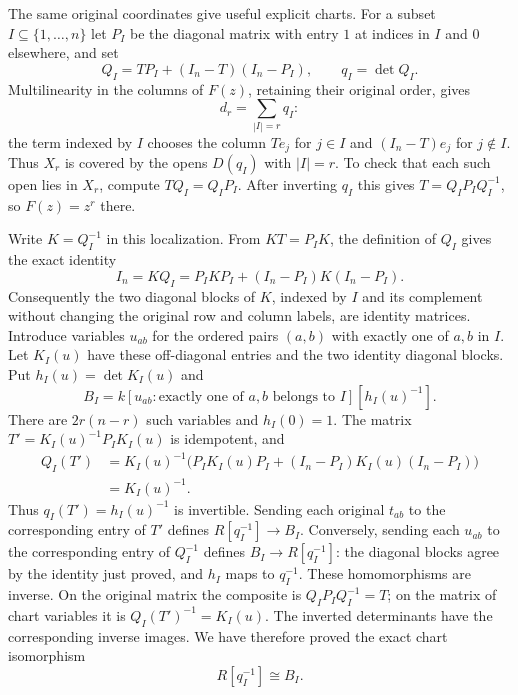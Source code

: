 \begin{example}
The same original coordinates give useful explicit charts.
For a subset $I\subseteq\{1,\ldots,n\}$ let $P_I$ be the diagonal
matrix with entry $1$ at indices in $I$ and $0$ elsewhere, and set
$$
Q_I=TP_I+(I_n-T)(I_n-P_I),\qquad q_I=\det Q_I.
$$
Multilinearity in the columns of $F(z)$, retaining their original
order, gives
$$
d_r=\sum_{|I|=r}q_I:
$$
the term indexed by $I$ chooses the column $Te_j$ for $j\in I$
and $(I_n-T)e_j$ for $j\notin I$.
Thus $X_r$ is covered by the opens $D(q_I)$ with $|I|=r$.
To check that each such open lies in $X_r$, compute
$TQ_I=Q_IP_I$. After inverting $q_I$ this gives
$T=Q_IP_IQ_I^{-1}$, so $F(z)=z^r$ there.

Write $K=Q_I^{-1}$ in this localization. From $KT=P_IK$,
the definition of $Q_I$ gives the exact identity
$$
I_n=KQ_I=P_IKP_I+(I_n-P_I)K(I_n-P_I).
$$
Consequently the two diagonal blocks of $K$, indexed by $I$ and
its complement without changing the original row and column labels,
are identity matrices. Introduce variables $u_{ab}$ for the ordered
pairs $(a,b)$ with exactly one of $a,b$ in $I$. Let $K_I(u)$ have
these off-diagonal entries and the two identity diagonal blocks.
Put $h_I(u)=\det K_I(u)$ and
$$
B_I=k[u_{ab}: \text{exactly one of }a,b\text{ belongs to }I]
[h_I(u)^{-1}].
$$
There are $2r(n-r)$ such variables and $h_I(0)=1$.
The matrix $T'=K_I(u)^{-1}P_IK_I(u)$ is idempotent, and
$$
\begin{aligned}
Q_I(T')
&=K_I(u)^{-1}\bigl(P_IK_I(u)P_I
 +(I_n-P_I)K_I(u)(I_n-P_I)\bigr)\\
&=K_I(u)^{-1}.
\end{aligned}
$$
Thus $q_I(T')=h_I(u)^{-1}$ is invertible. Sending each original
$t_{ab}$ to the corresponding entry of $T'$ defines
$R[q_I^{-1}]\to B_I$. Conversely, sending each $u_{ab}$ to the
corresponding entry of $Q_I^{-1}$ defines $B_I\to R[q_I^{-1}]$:
the diagonal blocks agree by the identity just proved, and
$h_I$ maps to $q_I^{-1}$. These homomorphisms are inverse.
On the original matrix the composite is $Q_IP_IQ_I^{-1}=T$;
on the matrix of chart variables it is $Q_I(T')^{-1}=K_I(u)$.
The inverted determinants have the corresponding inverse images.
We have therefore proved the exact chart isomorphism
$$
R[q_I^{-1}]\cong B_I.
$$


\end{example}
